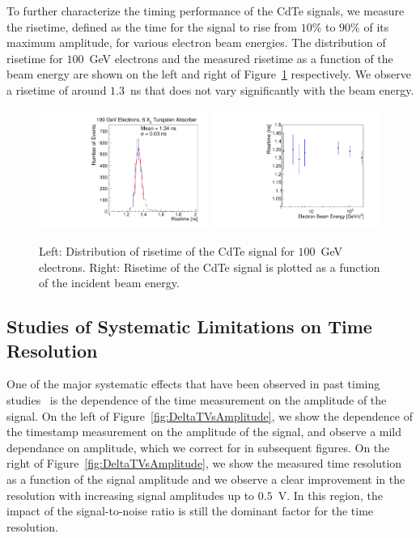 To further characterize the timing performance of the CdTe signals, we measure the
risetime, defined as the time for the signal to rise from $10\%$ to $90\%$ of its maximum
amplitude, for various electron beam energies. The distribution of risetime for
$100$~GeV electrons and the measured risetime as a function of the beam energy
are shown on the left and right of Figure~\ref{fig:riseTime} respectively. 
We observe a risetime of around $1.3$~ns that does not vary significantly
with the beam energy.


\begin{figure}[htbp] 
\centering
\includegraphics[width=0.49\textwidth]{figures/100GeV_risetime.pdf} 
\includegraphics[width=0.49\textwidth]{figures/RisetimeVsEnergy.pdf} 
\caption{ Left: Distribution of risetime of the CdTe signal for $100$~GeV electrons. 
Right: Risetime of the CdTe signal is plotted as a function of the incident beam energy. } 
\label{fig:riseTime} 
\end{figure} 



\subsection{Studies of Systematic Limitations on Time Resolution}
\label{sec:systematicLimitations}

One of the major systematic effects that have been observed in past
timing studies~\cite{Anderson:2015gha,Ronzhin201552,MCPShowerMaxPaper} is the dependence 
of the time measurement on the amplitude of the signal. On the left of 
Figure~\ref{fig:DeltaTVsAmplitude}, we show the dependence of the timestamp measurement 
on the amplitude of the signal, and observe a mild dependance on amplitude, which we correct for
in subsequent figures.
On the right of Figure~\ref{fig:DeltaTVsAmplitude}, we show the measured time resolution
as a function of the signal amplitude and we observe a clear improvement
in the resolution with increasing signal amplitudes up to $0.5$~V.
In this region, the impact of the signal-to-noise ratio is still 
the dominant factor for the time resolution.

